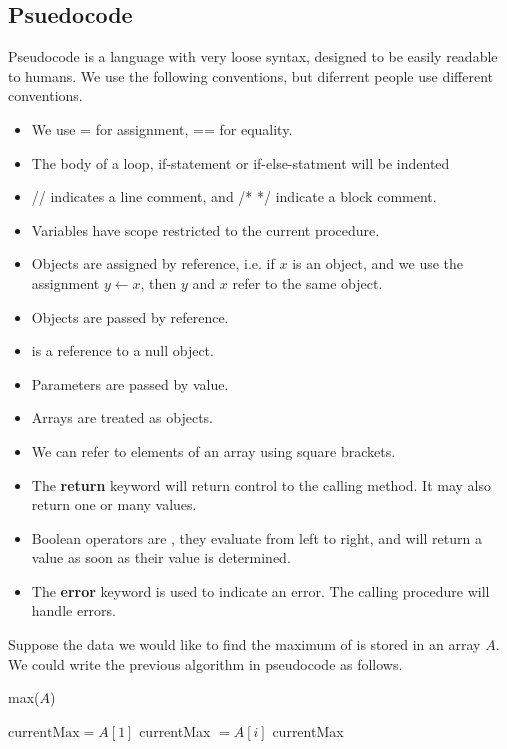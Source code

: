 \documentclass[11pt]{report}
\begin{document}
\subsection{Psuedocode}
Pseudocode is a language with very loose syntax, designed to be easily readable to humans. We use the following conventions, but diferrent people use different conventions.
\begin{itemize}
    \item We use = for assignment, == for equality. 
    \item The body of a loop, if-statement or if-else-statment will be indented
    \item // indicates a line comment, and /* */ indicate a block comment.
    \item Variables have scope restricted to the current procedure.
    \item Objects are assigned by reference, i.e. if $x$ is an object, and we use the assignment $y \gets x$, then $y$ and $x$ refer to the same object.
    \item Objects are passed by reference.
    \item {} is a reference to a null object.
    \item Parameters are passed by value.
    \item Arrays are treated as objects.
    \item We can refer to elements of an array using square brackets.
    \item The \textbf{return} keyword will return control to the calling method. It may also return one or many values.
    \item Boolean operators are , they evaluate from left to right, and will return a value as soon as their value is determined.
    \item The \textbf{error} keyword is used to indicate an error. The calling procedure will handle errors.
\end{itemize}
\begin{eg}
    Suppose the data we would like to find the maximum of is stored in an array $A$. We could write the previous algorithm in pseudocode as follows.
    \begin{algorithm}
        \caption{max($A$)}
        \label{alg:max}
        $\text{currentMax} = A[1]$\;
        {
            {
                currentMax $= A[i]$\; 
            }
        }
        \Return currentMax\;
    \end{algorithm}
\end{eg}
\pagebreak
\end{document}
